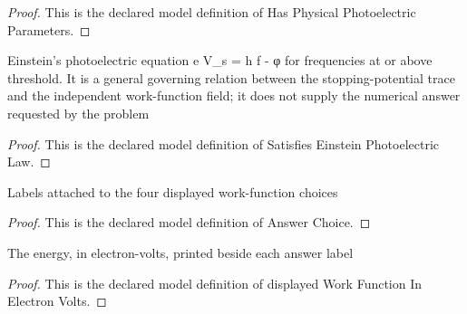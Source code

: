 \begin{proof}
  This is the declared model definition of Has Physical Photoelectric Parameters.
\end{proof}
\begin{definition}
  \label{def:physics:phyx-mini-0515:phyxminiproblems-problemphyxmini0515-satisfieseinsteinphotoelectriclaw}
  Einstein's photoelectric equation e V\_s = h f - φ for frequencies at or above threshold. It is a general governing relation between the stopping-potential trace and the independent work-function field; it does not supply the numerical answer requested by the problem
\end{definition}
\begin{proof}
  This is the declared model definition of Satisfies Einstein Photoelectric Law.
\end{proof}
\begin{definition}
  \label{def:physics:phyx-mini-0515:phyxminiproblems-problemphyxmini0515-answerchoice}
  Labels attached to the four displayed work-function choices
\end{definition}
\begin{proof}
  This is the declared model definition of Answer Choice.
\end{proof}
\begin{definition}
  \label{def:physics:phyx-mini-0515:phyxminiproblems-problemphyxmini0515-displayedworkfunctioninelectronvolts}
  The energy, in electron-volts, printed beside each answer label
\end{definition}
\begin{proof}
  This is the declared model definition of displayed Work Function In Electron Volts.
\end{proof}
